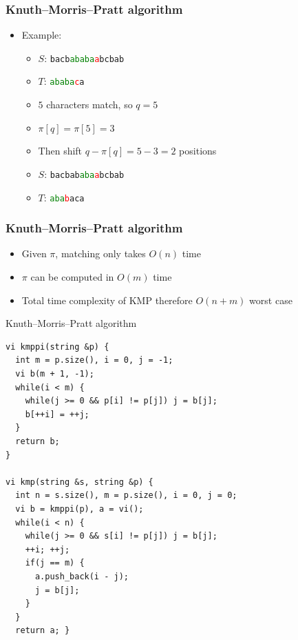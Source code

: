 \documentclass{beamer}
\begin{document}
\begin{frame}[plain]
    \frametitle{Knuth--Morris--Pratt algorithm}
    \begin{itemize}
        \item Example:
        \begin{itemize}
            \item $S$: \texttt{bacb\textcolor{green}{ababa}\textcolor{red}{a}bcbab}
            \item $T$: \texttt{\textcolor{green}{ababa}\textcolor{red}{c}a}
            \item<2-> $5$ characters match, so $q = 5$
            \item<3-> $\pi[q] = \pi[5] = 3$
            \item<4-> Then shift $q - \pi[q] = 5 - 3 = 2$ positions
            \item<5-> $S$: \texttt{bacbab\textcolor{green}{aba}\textcolor{red}{a}bcbab}
            \item<5-> $T$: \texttt{\textcolor{green}{aba}\textcolor{red}{b}aca}
        \end{itemize}
    \end{itemize}
\end{frame}

\begin{frame}[plain]
    \frametitle{Knuth--Morris--Pratt algorithm}
    \begin{itemize}
        \item Given $\pi$, matching only takes $O(n)$ time
        \item $\pi$ can be computed in $O(m)$ time
        \item Total time complexity of KMP therefore $O(n+m)$ worst case
    \end{itemize}
\end{frame}

\begin{frame}{Knuth--Morris--Pratt algorithm}
    \begin{verbatim}
vi kmppi(string &p) {
  int m = p.size(), i = 0, j = -1; 
  vi b(m + 1, -1);
  while(i < m) { 
    while(j >= 0 && p[i] != p[j]) j = b[j]; 
    b[++i] = ++j; 
  } 
  return b; 
}

vi kmp(string &s, string &p) {
  int n = s.size(), m = p.size(), i = 0, j = 0;
  vi b = kmppi(p), a = vi(); 
  while(i < n) {
    while(j >= 0 && s[i] != p[j]) j = b[j];
    ++i; ++j; 
    if(j == m) { 
      a.push_back(i - j);
      j = b[j]; 
    } 
  } 
  return a; }
    \end{verbatim}
\end{frame}
\end{document}
